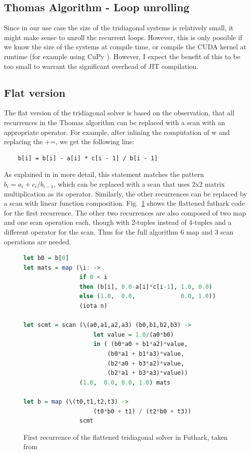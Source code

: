 \documentclass[a4paper,oneside]{memoir}
\begin{document}
\subsection{Thomas Algorithm - Loop unrolling}
Since in our use case the size of the tridiagonal systems is relatively small, it might make sense to unroll the recurrent loops. However, this is only possible if we know the size of the systems at compile time, or compile the CUDA kernel at runtime (for example using CuPy \cite{cupylearningsys2017}). 
However, I expect the benefit of this to be too small to warrant the significant overhead of JIT compilation.

\subsection{Flat version}
The flat version of the tridiagonal solver is based on the observation, 
that all recurrences in the Thomas algorithm can be replaced with a scan with an appropriate operator. 
For example, after inlining the computation of w and replacing the +=, we get the following line: 
\begin{verbatim}
    b[i] = b[i] - a[i] * c[i - 1] / b[i - 1] 
\end{verbatim}
As explained in \cite{andreetta2016finpar} in more detail, this statement matches the pattern $b_i = a_i + c_i / b_{i-1}$, which can be replaced with a scan that uses 2x2 matrix multiplication as its operator.
Similarly, the other recurrences can be replaced by a scan with linear function composition.
Fig.~\ref{fig:thomas_flat} shows the flattened futhark code for the first recurrence.
The other two recurrences are also composed of two map and one scan operation each, though with 2-tuples instead of 4-tuples and a different operator for the scan. Thus for the full algorithm 6 map and 3 scan operations are needed.

\begin{figure}[hbtp]
    \caption{First recurrence of the flattened tridiagonal solver in Futhark, taken from \cite{andreetta2016finpar}}
    \label{fig:thomas_flat}
    \begin{lstlisting}[language=haskell,frame=single]
let b0 = b[0]
let mats = map (\i: ->
                if 0 < i
                then (b[i], 0.0-a[i]*c[i-1], 1.0, 0.0)
                else (1.0,  0.0,             0.0, 1.0))
                (iota n)

let scmt = scan (\(a0,a1,a2,a3) (b0,b1,b2,b3) ->
                    let value = 1.0/(a0*b0)
                    in ( (b0*a0 + b1*a2)*value,
                        (b0*a1 + b1*a3)*value,
                        (b2*a0 + b3*a2)*value,
                        (b2*a1 + b3*a3)*value))
                (1.0,  0.0, 0.0, 1.0) mats

let b = map (\(t0,t1,t2,t3) ->
                    (t0*b0 + t1) / (t2*b0 + t3))
                scmt
    \end{lstlisting}
\end{figure}
\end{document}
